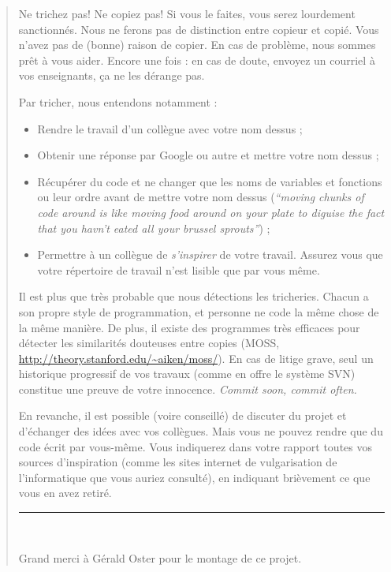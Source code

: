 \documentclass[10pt]{article}
\begin{document}
\begin{quote}
Ne trichez pas! Ne copiez pas!
Si vous le faites, vous serez lourdement sanctionnés. Nous ne ferons pas de distinction entre copieur et copié.
Vous n'avez pas de (bonne) raison de copier. En cas de problème, nous sommes prêt à vous aider. 
Encore une fois : en cas de doute, envoyez un courriel à vos enseignants, ça ne les dérange pas.

Par tricher, nous entendons notamment :
\begin{itemize}
  \item Rendre le travail d'un collègue avec votre nom dessus ;
  \item Obtenir une réponse par Google\texttrademark{} ou autre et mettre votre nom dessus ;
  \item Récupérer du code et ne changer que les noms de variables et fonctions ou leur ordre avant de mettre votre nom dessus
      (\emph{``moving chunks of code around is like moving food around on your plate to diguise the fact that you havn't eated all your brussel sprouts''}) ;
  \item Permettre à un collègue de \emph{s'inspirer} de votre travail. Assurez vous que votre répertoire de travail n'est lisible que par vous même.
\end{itemize}

Il est plus que très probable que nous détections les tricheries. Chacun a son
propre style de programmation, et personne ne code la même chose de la même
manière. De plus, il existe des programmes très efficaces pour détecter les
similarités douteuses entre copies (MOSS,
\url{http://theory.stanford.edu/~aiken/moss/}). En cas de litige grave, seul un
historique progressif de vos travaux (comme en offre le système SVN) constitue
une preuve de votre innocence. \textit{Commit soon, commit often.}

\medskip
En revanche, il est possible (voire conseillé) de discuter du projet et
d'échanger des idées avec vos collègues. Mais vous ne pouvez rendre que du code
écrit par vous-même. Vous indiquerez dans votre rapport toutes vos sources
d'inspiration (comme les sites internet de vulgarisation de l'informatique que
vous auriez consulté), en indiquant brièvement ce que vous en avez retiré.

\bigskip

\hspace{-2em}\begin{minipage}{1.0\linewidth}
  
\noindent \begin{minipage}{.3\linewidth}
\hrule

~
\end{minipage}

\noindent Grand merci à Gérald Oster pour le montage de ce projet.
\end{minipage}



\end{quote}
\end{document}

